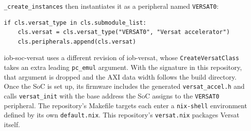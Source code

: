 \texttt{\_create\_instances} then instantiates it as a peripheral named \texttt{VERSAT0}:

\begin{lstlisting}[caption={iob\_soc\_versat.py}]
if cls.versat_type in cls.submodule_list:
    cls.versat = cls.versat_type("VERSAT0", "Versat accelerator")
    cls.peripherals.append(cls.versat)
\end{lstlisting}

iob-soc-versat uses a different revision of iob-versat, whose \texttt{CreateVersatClass} takes an extra leading \texttt{pc\_emul} argument. With the signature in this repository, that argument is dropped and the AXI data width follows the build directory. Once the SoC is set up, its firmware includes the generated \texttt{versat\_accel.h} and calls \texttt{versat\_init} with the base address the SoC assigns to the \texttt{VERSAT0} peripheral. The repository's Makefile targets each enter a \texttt{nix-shell} environment defined by its own \texttt{default.nix}. This repository's \texttt{versat.nix} packages Versat itself.

